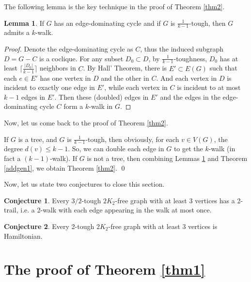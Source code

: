 \documentclass{amsart}
\theoremstyle{definition}
\newtheorem{conjecture}{Conjecture}
\newtheorem{lemma}{Lemma}
\begin{document}
The following lemma is the key technique in the proof of Theorem \ref{thm2}.

\begin{lemma}\label{addtec}
If $G$ has an edge-dominating cycle and if $G$ is $\frac{1}{k-1}$-tough, then $G$ admits a $k$-walk.
\end{lemma}

\begin{proof}
Denote the edge-dominating cycle as $C$, thus the induced subgraph $D=G-C$ is a coclique. For any subset $D_0\subset D$, by $\frac{1}{k-1}$-toughness, $D_0$ has at least $\lceil\frac{|D_0|}{k-1}\rceil$ neighbors in $C$. By Hall' Theorem, there is $E'\subset E(G)$ such that each $e\in E'$ has one vertex in $D$ and the other in $C$. And each vertex in $D$ is incident to exactly one edge in $E'$, while each vertex in $C$ is incident to at most $k-1$ edges in $E'$. Then these (doubled) edges in $E'$ and the edges in the edge-dominating cycle $C$ form a $k$-walk in $G$.
\end{proof}

Now, let us come back to the proof of Theorem \ref{thm2}.

If $G$ is a tree, and $G$ is $\frac{1}{k-1}$-tough, then obviously, for each $v\in V(G)$, the degree $d(v)\le k-1$. So, we can double each edge in $G$ to get the $k$-walk (in fact a $(k-1)$-walk).
If $G$ is not a tree, then
combining Lemmas \ref{addtec}  and Theorem \ref{addgen1},
we obtain Theorem \ref{thm2}.
\qed


\medskip

Now, let us state two conjectures to close this section.
\begin{conjecture}
Every $3/2$-tough $2K_2$-free graph with at least 3 vertices has a 2-trail, i.e. a 2-walk with each edge appearing in the walk at most once.
\end{conjecture}


\begin{conjecture}
Every 2-tough $2K_2$-free graph with at least 3 vertices is Hamiltonian.
\end{conjecture}









\section{The proof of Theorem \ref{thm1}}
\end{document}
